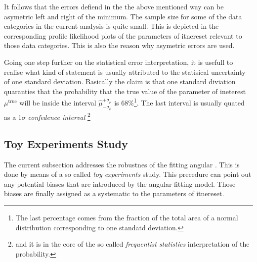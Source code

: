 It follows that the errors defiend in the the above mentioned way can be asymetric left and right of the minimum. 
The sample size for some of the data categories in the current analysis is quite small. This is depicted in the corresponding profile 
likelihood plots of the parameters of itnereset relevant to those data categories. This is also the reason why asymetric errors are used. 

Going one step further on the statistical error interpretation, it is usefull to realise what kind of statement is usually
attributed to the statisical uncertainty of one standard deviation. Basically the claim is that one standard diviation
quaranties that the probability that the true value of the parameter of ineterest $\mu^{\text{true}}$ will be inside the
interval $\hat{\mu}_{-\sigma_\mu}^{+\sigma_\mu}$ is $68\%$\footnote{The last percentage comes from the fraction of the total area of a normal distribution corresponding to one standatd deviation.}.
The last interval is usually quated as a $1\sigma$ {\it confedence interval} \footnote{and it is in the core of the so called {\it frequentist statistics}
interpretation of the probability.}





\subsection{Toy Experiments Study}
\label{Toy_Experiments_Study}

The current subsection addresses the robustnes of the fitting angular \pdf.
This is done by means of a so called {\it toy experiments} study. This precedure
can point out any potential biases that are introduced by the angular fitting model.
Those biases are finally assigned as a systematic to the parameters of itnereset.


